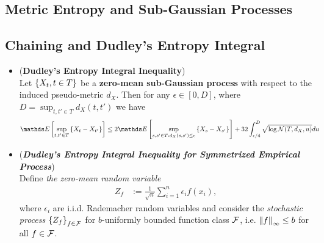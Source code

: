 \documentclass[11pt]{article}
\begin{document}
\subsection{Metric Entropy and Sub-Gaussian Processes}
\subsection{Chaining and Dudley's Entropy Integral}
\begin{itemize}
\item \begin{theorem} (\textbf{Dudley's Entropy Integral Inequality}) \citep{vershynin2018high, wainwright2019high}\\
Let $\left\{X_{t}, t \in T\right\}$ be a \textbf{zero-mean sub-Gaussian process} with respect to the induced pseudo-metric $d_X$. Then for any $\epsilon \in [0, D]$, where $D  = \sup_{t, t'\in T}d_{X}(t, t')$ we have
\begin{align}
\E{}{\sup_{t, t' \in T}\set{X_t - X_{t'}}} &\le 2\E{}{\sup_{s, s' \in T: d_X(s, s') \le \epsilon}\set{X_s - X_{s'}}} + 32 \int_{\epsilon/4}^{D}\sqrt{\log \cN(T, d_{X}, u)} du \label{ineqn: dudley_metric_entropy_integral_inequality}
\end{align}
\end{theorem}

\item \begin{remark} (\textbf{\emph{Dudley's Entropy Integral Inequality for Symmetrized Empirical Process}}) \\
Define \emph{the zero-mean random variable} 
\begin{align*}
Z_f &:= \frac{1}{\sqrt{n}}\sum_{i=1}^n \epsilon_i f(x_i),
\end{align*} where $\epsilon_i$ are i.i.d. Rademacher random variables and consider the \emph{stochastic process} $\left\{Z_f\right\}_{ f \in {\mathcal F}}$ for $b$-uniformly bounded function class ${\mathcal F}$, i.e. $\left\|f\right\|_{\infty} \le b$ for all $f \in {\mathcal F}$.


\end{remark}
\end{itemize}
\end{document}
